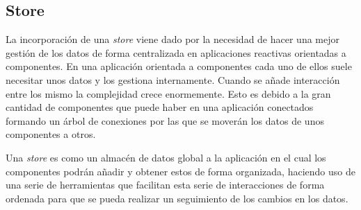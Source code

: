 \subsection{Store}
%

La incorporación de una \textit{store} viene dado por la necesidad de hacer una mejor gestión de los datos de forma centralizada en aplicaciones reactivas orientadas a componentes. En una aplicación orientada a componentes cada uno de ellos suele necesitar unos datos y los gestiona internamente. Cuando se añade interacción entre los mismo la complejidad crece enormemente. Esto es debido a la gran cantidad de componentes que puede haber en una aplicación conectados formando un árbol de conexiones por las que se moverán los datos de unos componentes a otros.

Una \textit{store} es como un almacén de datos global a la aplicación en el cual los componentes podrán añadir y obtener estos de forma organizada, haciendo uso de una serie de herramientas que facilitan esta serie de interacciones de forma ordenada para que se pueda realizar un seguimiento de los cambios en los datos.

